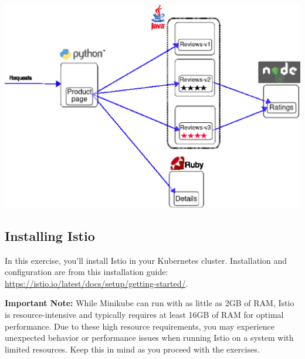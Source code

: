 \documentclass{article}
\begin{document}
\includegraphics[scale=0.3]{imgs/bookinfo.eps}

\subsection{Installing Istio}
In this exercise, you'll install Istio in your Kubernetes cluster.
Installation and configuration are from this installation guide: \footnotesize\url{https://istio.io/latest/docs/setup/getting-started/}. \\

\normalsize

\textbf{Important Note:} While Minikube can run with as little as 2GB of RAM, Istio is resource-intensive and typically requires at least 16GB of RAM for optimal performance. Due to these high resource requirements, you may experience unexpected behavior or performance issues when running Istio on a system with limited resources. Keep this in mind as you proceed with the exercises. \\
\end{document}
